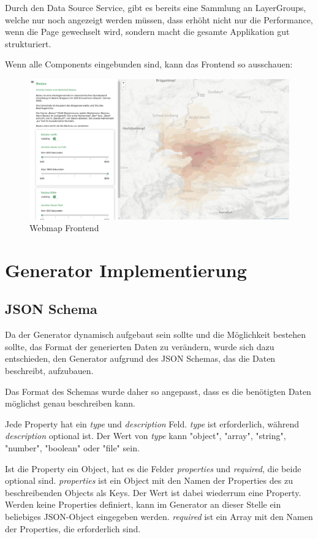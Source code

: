 Durch den Data Source Service, gibt es bereits eine Sammlung an LayerGroups, welche nur noch angezeigt werden müssen,
dass erhöht nicht nur die Performance, wenn die Page gewechselt wird, sondern macht die gesamte Applikation gut strukturiert.

Wenn alle Components eingebunden sind, kann das Frontend so ausschauen:
\begin{figure}[hbt!]
    \centering
    \includegraphics[scale=.3]{pics/webmap-frontend}
    \caption{Webmap Frontend}
    \label{fig:webmap-frontend}
\end{figure}


\section{Generator Implementierung}

\subsection{JSON Schema}
Da der Generator dynamisch aufgebaut sein sollte und die Möglichkeit bestehen sollte, das Format der generierten
Daten zu verändern, wurde sich dazu entschieden, den Generator aufgrund des JSON Schemas, das die Daten beschreibt,
aufzubauen.

Das Format des Schemas wurde daher so angepasst, dass es die benötigten Daten möglichst genau beschreiben kann.

Jede Property hat ein \textit{type} und \textit{description} Feld.
\textit{type} ist erforderlich, während \textit{description} optional ist.
Der Wert von \textit{type} kann "object", "array", "string", "number", "boolean" oder "file" sein.

Ist die Property ein Object, hat es die Felder \textit{properties} und \textit{required}, die beide optional sind.
\textit{properties} ist ein Object mit den Namen der Properties des zu beschreibenden Objects als Keys.
Der Wert ist dabei wiederrum eine Property.
Werden keine Properties definiert, kann im Generator an dieser Stelle ein beliebiges JSON-Object eingegeben werden.
\textit{required} ist ein Array mit den Namen der Properties, die erforderlich sind.


